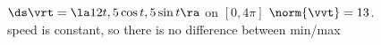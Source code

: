 {$\ds \vrt = \la 12t,5\cos t,5\sin t \ra$ on $[0,4\pi]$
}
{
$\norm{\vvt} = 13$. \\
speed is constant, so there is no difference between min/max
}